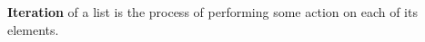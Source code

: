 \HdrDescription

\textbf{Iteration} of a list is the process of performing some action on each of its elements.